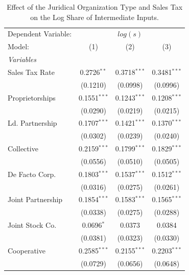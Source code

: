 \documentclass[
  12pt]{article}
\begin{document}
\begin{table}

\caption{\label{tbl-reg-jo-tax}Effect of the Juridical Organization Type
and Sales Tax on the Log Share of Intermediate Inputs.}

\begin{minipage}{\linewidth}

\begingroup
\centering
\begin{tabular}{lccc}
   \tabularnewline \midrule \midrule
   Dependent Variable: & \multicolumn{3}{c}{\(log(s)\)}\\
   Model:            & (1)            & (2)             & (3)\\  
   \midrule
   \emph{Variables}\\
   Sales Tax Rate    & 0.2726$^{**}$  & 0.3718$^{***}$  & 0.3481$^{***}$\\   
                     & (0.1210)       & (0.0998)        & (0.0996)\\   
   Proprietorships   & 0.1551$^{***}$ & 0.1243$^{***}$  & 0.1208$^{***}$\\   
                     & (0.0290)       & (0.0219)        & (0.0215)\\   
   Ld. Partnership   & 0.1707$^{***}$ & 0.1421$^{***}$  & 0.1370$^{***}$\\   
                     & (0.0302)       & (0.0239)        & (0.0240)\\   
   Collective        & 0.2159$^{***}$ & 0.1799$^{***}$  & 0.1829$^{***}$\\   
                     & (0.0556)       & (0.0510)        & (0.0505)\\   
   De Facto Corp.    & 0.1803$^{***}$ & 0.1537$^{***}$  & 0.1512$^{***}$\\   
                     & (0.0316)       & (0.0275)        & (0.0261)\\   
   Joint Partnership & 0.1854$^{***}$ & 0.1583$^{***}$  & 0.1565$^{***}$\\   
                     & (0.0338)       & (0.0275)        & (0.0288)\\   
   Joint Stock Co.   & 0.0696$^{*}$   & 0.0373          & 0.0384\\   
                     & (0.0381)       & (0.0323)        & (0.0330)\\   
   Cooperative       & 0.2585$^{***}$ & 0.2155$^{***}$  & 0.2203$^{***}$\\   
                     & (0.0729)       & (0.0656)        & (0.0648)\\   

\end{tabular}
\end{minipage}
\end{table}
\end{document}
